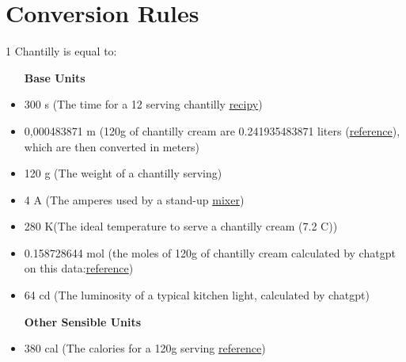 \documentclass[12pt, a4paper]{report}
\begin{document}
\section{Conversion Rules}
1 Chantilly is equal to:
\begin{itemize}
    \item [\textbf{Base Units}]
    \item 300 s (The time for a 12 serving chantilly \href{https://www.thespruceeats.com/vanilla-chantilly-cream-recipe-1375640}{recipy})
    \item 0,000483871 m (120g of chantilly cream are 0.241935483871 liters (\href{https://www.inchcalculator.com/convert/gram-to-liter/}{reference}), which are then converted in meters)
    \item 120 g (The weight of a chantilly serving)
    \item 4 A (The amperes used by a stand-up \href{https://anationofmoms.com/2023/04/stand-up-mixer-amps.html}{mixer})
    \item 280 K\textdegree (The ideal temperature to serve a chantilly cream (7.2 C\textdegree))
    \item 0.158728644 mol (the moles of 120g of chantilly cream calculated by chatgpt on this data:\href{https://www.fatsecret.com/calories-nutrition/generic/chantilly-cream?portionid=49910&portionamount=100.000&frc=True}{reference})
    \item 64 cd (The luminosity of a typical kitchen light, calculated by chatgpt)
\end{itemize}
\begin{itemize}
    \item [\textbf{Other Sensible Units}]
    \item 380 cal (The calories for a 120g serving \href{https://www.fatsecret.com/calories-nutrition/generic/chantilly-cream?portionid=49910&portionamount=100.000&frc=True}{reference})
\end{itemize}



\end{document}
